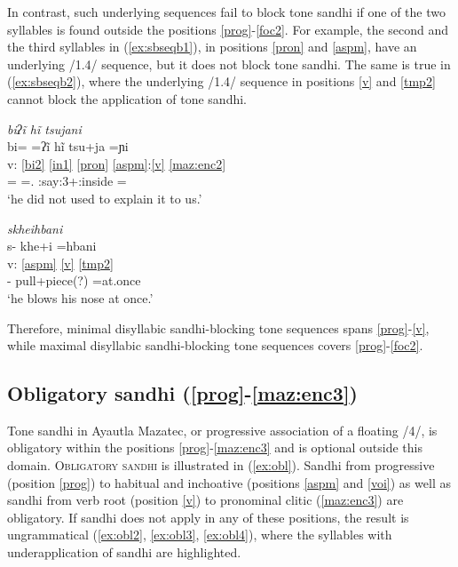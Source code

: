 \documentclass[output=paper]{langscibook}
\begin{document}
In contrast, such underlying sequences fail to block tone sandhi if one of the two syllables is found outside the positions \ref{prog}-\ref{foc2}. For example, the second and the third syllables in (\ref{ex:sbseqb1}), in positions \ref{pron} and \ref{aspm}, have an underlying /1.4/ sequence, but it does not block tone sandhi. The same is true in (\ref{ex:sbseqb2}), where the underlying /1.4/ sequence in positions \ref{v} and \ref{tmp2} cannot block the application of tone sandhi.

\ea \label{ex:sbseqb}
\ea \label{ex:sbseqb1} \textit{bi\4ʔĩ\2 \st{}hĩ\4\1 tsu\4\st{}ja\2ni\2\3}\\
\glll {} bi\4= =ʔĩ\3\ff{} hĩ\1 tsu\4+ja\2 =ɲi\2\3\\
v: \ref{bi2} \ref{in1} \ref{pron} \ref{aspm}:\ref{v} \ref{maz:enc2}\\
{} \Neg= =\Pst.\Hab{} \Incl{} \Hab:say:3+\Pos:inside =\Asr\\
\glt `he did not used to explain it to us.'

\ex \label{ex:sbseqb2} \textit{skhe\2\st\xy{}i\4\1hba\4ni\2\3}\\
\glll {} s- khe\3\ff+\xy{}i\1 =hba\4ni\2\3\\
v: \ref{aspm} \ref{v} \ref{tmp2}\\
{} \Pot- pull+piece(?) =at.once\\
\glt `he blows his nose at once.'
\z
\z

\noindent
Therefore, minimal disyllabic sandhi-blocking tone sequences spans \ref{prog}-\ref{v}, while maximal disyllabic sandhi-blocking tone sequences covers \ref{prog}-\ref{foc2}.

\subsection{Obligatory sandhi (\ref{prog}-\ref{maz:enc3})}\label{sec:d:sandhi2}
Tone sandhi in Ayautla Mazatec, or progressive association of a floating /4/, is obligatory within the positions \ref{prog}-\ref{maz:enc3} and is optional outside this domain.
\textsc{Obligatory sandhi} is illustrated in (\ref{ex:obl}). Sandhi from progressive (position \ref{prog}) to habitual and inchoative (positions \ref{aspm} and \ref{voi}) as well as sandhi from verb root (position \ref{v}) to pronominal clitic (\ref{maz:enc3}) are obligatory. If sandhi does not apply in any of these positions, the result is ungrammatical (\ref{ex:obl2}, \ref{ex:obl3}, \ref{ex:obl4}), where the syllables with underapplication of sandhi are highlighted.
\end{document}
